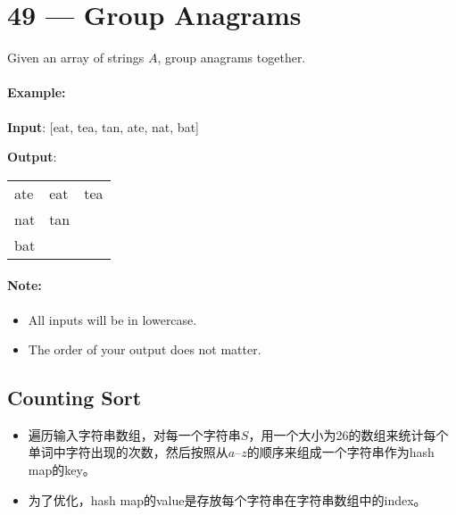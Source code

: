 \section{49 --- Group Anagrams}
Given an array of strings $A$, group anagrams together.

\paragraph{Example:}
\begin{flushleft}

\textbf{Input}: [eat, tea, tan, ate, nat, bat]


\textbf{Output}:

\begin{table}[H]
\begin{tabular}{lll}
ate & eat & tea \\
nat & tan & \\
bat & &
\end{tabular}
\end{table}

\end{flushleft}
\paragraph{Note:}

\begin{itemize}
\item All inputs will be in lowercase.
\item The order of your output does not matter.
\end{itemize}

\subsection{Counting Sort}
\begin{itemize}
\item 遍历输入字符串数组，对每一个字符串$S$，用一个大小为26的数组来统计每个单词中字符出现的次数，然后按照从$a$--$z$的顺序来组成一个字符串作为hash map的key。
\item 为了优化，hash map的value是存放每个字符串在字符串数组中的index。
\end{itemize}

